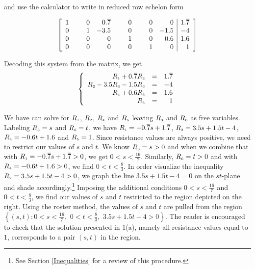\begin{ex}
\begin{enumerate}
and use the calculator to write in reduced row echelon form

\[\left[ \begin{array}{rrrrrr|r} 
1 & \hphantom{-1.}0 & 0.\overline{7} & \hphantom{-1.}0 & \hphantom{-1.}0 & 0 & 1.\overline{7} \\ 
0 & 1 & -3.5           & 0 & 0 & -1.5 & -4 \\ 
0 & 0 & 0              & 1 & 0 & 0.6 & 1.6 \\ 
0 & 0 & 0              & 0 & 1 & 0 & 1 \\ 
\end{array} \right] \]

Decoding this system from the matrix, we get
\[ \left\{ \begin{array}{rcr} R_{\mbox{\tiny$1$}} + 0.\overline{7}R_{\mbox{\tiny$3$}}& = & 1.\overline{7} \\
R_{\mbox{\tiny$2$}} - 3.5R_{\mbox{\tiny$3$}} - 1.5R_{\mbox{\tiny$6$}}& = & -4 \\
R_{\mbox{\tiny$4$}} + 0.6R_{\mbox{\tiny$6$}} & = & 1.6 \\
R_{\mbox{\tiny$5$}}& = & 1 \\  \end{array} \right.\]

We have can solve for $R_{\mbox{\tiny$1$}}$, $R_{\mbox{\tiny$2$}}$, $R_{\mbox{\tiny$4$}}$ and $R_{\mbox{\tiny$5$}}$ leaving $R_{\mbox{\tiny$3$}}$ and $R_{\mbox{\tiny$6$}}$ as free variables.  Labeling $R_{\mbox{\tiny$3$}} = s$ and $R_{\mbox{\tiny$6$}} = t$, we have $R_{\mbox{\tiny$1$}} = - 0.\overline{7}s + 1.\overline{7}$, $R_{\mbox{\tiny$2$}} = 3.5s + 1.5t - 4$, $R_{\mbox{\tiny$4$}} = -0.6t + 1.6$ and $R_{\mbox{\tiny$5$}} = 1$.  Since resistance values are always positive, we need to restrict our values of $s$ and $t$.  We know $R_{\mbox{\tiny$3$}} = s > 0$ and when we combine that with $R_{\mbox{\tiny$1$}} = - 0.\overline{7}s + 1.\overline{7} >0$, we get $0 < s < \frac{16}{7}$.  Similarly, $R_{\mbox{\tiny$6$}} = t > 0$ and with $R_{\mbox{\tiny$4$}} = -0.6t + 1.6 > 0$, we find $0 < t < \frac{8}{3}$.  In order visualize the inequality $R_{\mbox{\tiny$2$}} = 3.5s + 1.5t - 4 > 0$, we graph the line $3.5s + 1.5t - 4 =0$ on the $st$-plane and shade accordingly.\footnote{See Section \ref{Inequalities} for a review of this procedure.}  Imposing the additional conditions $0 < s < \frac{16}{7}$ and $0 < t < \frac{8}{3}$, we find our values of $s$ and $t$ restricted to the region depicted on the right.  Using the roster method, the values of $s$ and $t$ are pulled from the region $\left\{ (s,t) : 0 < s < \frac{16}{7}, \, \,  0 < t < \frac{8}{3}, \, \, 3.5s+1.5t-4 > 0\right\}$.  The reader is encouraged to check that the solution presented in 1(a), namely all resistance values equal to $1$, corresponds to a pair $(s,t)$ in the region.


\end{enumerate}
\end{ex}
